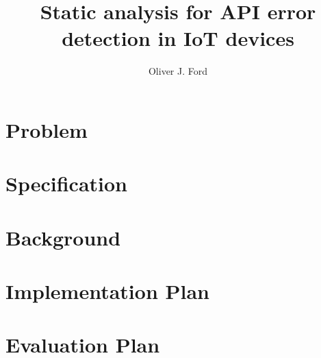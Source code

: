 \documentclass{article}
\title{Static analysis for API error detection in IoT devices}
\author{Oliver J. Ford}
\begin{document}


\FloatBarrier
\section{Problem}\label{problem}
{}
\FloatBarrier

\FloatBarrier
\section{Specification}\label{spec}
{}
\FloatBarrier

\FloatBarrier
\section{Background}\label{background}
{}
\FloatBarrier

\FloatBarrier
\section{Implementation Plan}\label{plan-impl}
{}
\FloatBarrier

\FloatBarrier
\section{Evaluation Plan}\label{plan-eval}
{}
\FloatBarrier

\printbibliography
\end{document}
